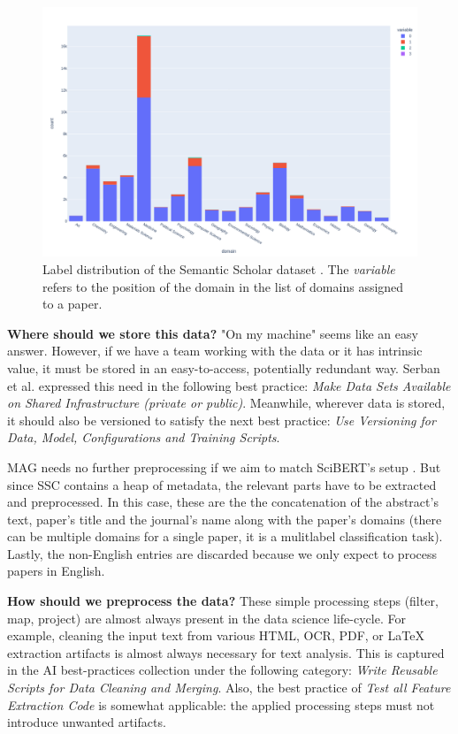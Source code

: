 \begin{figure}
    \centering
    \includegraphics[width=\linewidth]{figures/ss-distribution.png}
    \caption{Label distribution of the Semantic Scholar dataset \cite{Lo2020S2ORCTS}. The \textit{variable} refers to the position of the domain in the list of domains assigned to a paper.}
    \label{fig:ss-distribution}
\end{figure}

\begin{displayquote}
\textbf{Where should we store this data?} "On my machine" seems like an easy answer. However, if we have a team working with the data or it has intrinsic value, it must be stored in an easy-to-access, potentially redundant way. Serban et al. \cite{serban2020adoption} expressed this need in the following best practice: \textit{Make Data Sets Available on Shared Infrastructure (private or public)}. Meanwhile, wherever data is stored, it should also be versioned to satisfy the next best practice: \textit{Use Versioning for Data, Model, Configurations and Training Scripts}.
\end{displayquote}

MAG needs no further preprocessing if we aim to match SciBERT's setup \cite{beltagy2019scibert}. But since SSC contains a heap of metadata, the relevant parts have to be extracted and preprocessed. In this case, these are the the concatenation of the abstract's text, paper's title and the journal's name along with the paper's domains (there can be multiple domains for a single paper, it is a mulitlabel classification task). Lastly, the non-English entries are discarded because we only expect to process papers in  English.

\begin{displayquote}
\textbf{How should we preprocess the data?} These simple processing steps (filter, map, project) are almost always present in the data science life-cycle. For example, cleaning the input text from various HTML, OCR, PDF, or \LaTeX \hskip 0.12cm extraction artifacts is almost always necessary for text analysis. This is captured in the AI best-practices collection under the following category: \textit{Write Reusable Scripts for Data Cleaning and Merging}. Also, the best practice of \textit{Test all Feature Extraction Code} is somewhat applicable: the applied processing steps must not introduce unwanted artifacts.
\end{displayquote}


